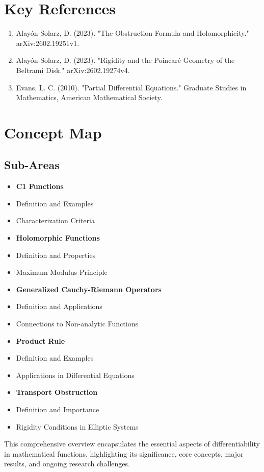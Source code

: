 \documentclass[11pt,a4paper]{article}
\begin{document}
\section{Key References}

\begin{enumerate}
\item Alayón-Solarz, D. (2023). "The Obstruction Formula and Holomorphicity." arXiv:2602.19251v1.
\item Alayón-Solarz, D. (2023). "Rigidity and the Poincaré Geometry of the Beltrami Disk." arXiv:2602.19274v4.
\item Evans, L. C. (2010). "Partial Differential Equations." Graduate Studies in Mathematics, American Mathematical Society.
\end{enumerate}

\section{Concept Map}

\subsection{Sub-Areas}
\begin{itemize}
\item \textbf{C1 Functions}
\item Definition and Examples
\item Characterization Criteria
\item \textbf{Holomorphic Functions}
\item Definition and Properties
\item Maximum Modulus Principle
\item \textbf{Generalized Cauchy-Riemann Operators}
\item Definition and Applications
\item Connections to Non-analytic Functions
\item \textbf{Product Rule}
\item Definition and Examples
\item Applications in Differential Equations
\item \textbf{Transport Obstruction}
\item Definition and Importance
\item Rigidity Conditions in Elliptic Systems
\end{itemize}

This comprehensive overview encapsulates the essential aspects of differentiability in mathematical functions, highlighting its significance, core concepts, major results, and ongoing research challenges.
\end{document}
